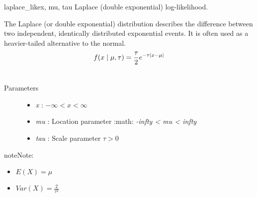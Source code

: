 \hypertarget{pymc.distributions.laplace_like}{}\begin{funcdesc}{laplace\_like}{x, mu, tau}
Laplace (double exponential) log-likelihood.

The Laplace (or double exponential) distribution describes the
difference between two independent, identically distributed exponential
events. It is often used as a heavier-tailed alternative to the normal.
\begin{gather}
\begin{split}f(x \mid \mu, \tau) = \frac{\tau}{2}e^{-\tau |x-\mu|}\end{split}\notag\\\begin{split}\end{split}\notag
\end{gather}\begin{description}
\item[Parameters] \leavevmode\begin{itemize}
\item {}
\emph{x} : $-\infty < x < \infty$

\item {}
\emph{mu} : Location parameter :math: \emph{-infty \textless{} mu \textless{} infty}

\item {}
\emph{tau} : Scale parameter $\tau > 0$

\end{itemize}

\end{description}

\begin{notice}{note}{Note:}\begin{itemize}
\item {}
$E(X) = \mu$

\item {}
$Var(X) = \frac{2}{\tau^2}$

\end{itemize}
\end{notice}
\end{funcdesc}

